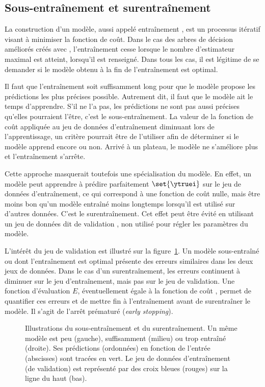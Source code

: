 \subsection{Sous-entraînement et surentraînement}
La construction d'un modèle, aussi appelé \og entraînement \fg,
est un processus itératif
visant à minimiser la fonction de coût.
Dans le cas des arbres de décision améliorés créés avec \XGBOOST,
l'entraînement cesse lorsque le nombre d'estimateur maximal est atteint, lorsqu'il est renseigné.
Dans tous les cas, il est légitime de se demander si le modèle obtenu à la fin de l'entraînement est optimal.
\par
Il faut que l'entraînement soit suffisamment long pour que le modèle propose les prédictions les plus précises possible.
Autrement dit, il faut que le modèle ait le temps d'apprendre.
S'il ne l'a pas, les prédictions ne sont pas aussi précises qu'elles pourraient l'être, c'est le sous-entraînement.
La valeur de la fonction de coût appliquée au jeu de données d'entraînement diminuant lors de l'apprentissage,
un critère pourrait être de l'utiliser afin de déterminer si le modèle apprend encore ou non.
Arrivé à un plateau, le modèle ne s'améliore plus et l'entraînement s'arrête.
\par
Cette approche masquerait toutefois une spécialisation du modèle.
En effet, un modèle peut apprendre à prédire parfaitement $\set{\ytruei}$ sur le jeu de données d'entraînement,
ce qui correspond à une fonction de coût nulle,
mais être moins bon qu'un modèle entraîné moins longtemps lorsqu'il est utilisé sur d'autres données.
C'est le surentraînement.
Cet effet peut être évité en utilisant un jeu de données dit de \og validation \fg,
non utilisé pour régler les paramètres du modèle.
\par
L'intérêt du jeu de validation est illustré sur la figure~\ref{fig-underfitting_and_overfitting}.
Un modèle sous-entraîné ou dont l'entraînement est optimal présente des erreurs similaires dans les deux jeux de données.
Dans le cas d'un surentraînement, les erreurs continuent à diminuer sur le jeu d'entraînement, mais pas sur le jeu de validation.
Une fonction d'évaluation $E$, éventuellement égale à la fonction de coût \Loss, permet de quantifier ces erreurs et de mettre fin à l'entraînement avant de surentraîner le modèle.
Il s'agit de l'arrêt prématuré (\emph{early stopping}).
\begin{figure}[h]
\centering

\caption[Illustrations du sous-entraînement et du surentraînement.]{Illustrations du sous-entraînement et du surentraînement.
Un même modèle est peu (gauche), suffisamment (milieu) ou trop entraîné (droite). Ses prédictions (ordonnées) en fonction de l'entrée (abscisses) sont tracées en vert.
Le jeu de données d'entraînement (de validation) est représenté par des croix bleues (rouges) sur la ligne du haut (bas).}
\label{fig-underfitting_and_overfitting}
\end{figure}
